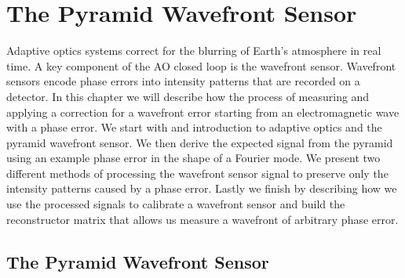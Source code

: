 \chapter{The Pyramid Wavefront Sensor}\label{CH2}

Adaptive optics systems correct for the blurring of Earth's atmosphere in real time. A key component of the AO closed loop is the wavefront sensor. Wavefront sensors encode phase errors into intensity patterns that are recorded on a detector. In this chapter we will describe how the process of measuring and applying a correction for a wavefront error starting from an electromagnetic wave with a phase error. We start with and introduction to adaptive optics and the pyramid wavefront sensor. We then derive the expected signal from the pyramid using an example phase error in the shape of a Fourier mode. We present two different methods of processing the wavefront sensor signal to preserve only the intensity patterns caused by a phase error. Lastly we finish by describing how we use the processed signals to calibrate a wavefront sensor and build the reconstructor matrix that allows us measure a wavefront of arbitrary phase error. 







\section{The Pyramid Wavefront Sensor}


